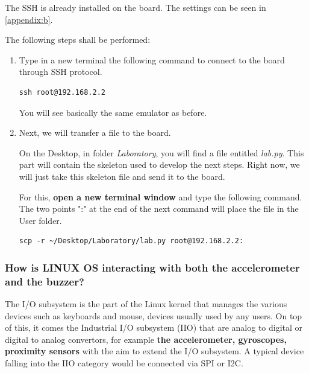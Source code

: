 The SSH is already installed on the board. The settings can be seen in \cref{appendix:b}.

The following steps shall be performed: 
\begin{enumerate}
    \item Type in a new terminal the following command to connect to the board through SSH protocol.
    \begin{tcolorbox}
        \begin{verbatim}
ssh root@192.168.2.2
        \end{verbatim}
    \end{tcolorbox}
    You will see basically the same emulator as before.

    \item Next, we will transfer a file to the board.

    On the Desktop, in folder \textit{Laboratory}, you will find a file entitled \textit{lab.py}. This part will contain the skeleton used to develop the next steps. Right now, we will just take this skeleton file and send it to the board.

    For this, \textbf{open a new terminal window} and type the following command. The two points ":" at the end of the next command will place the file in the User folder.
    \begin{tcolorbox}
     \begin{verbatim}
scp -r ~/Desktop/Laboratory/lab.py root@192.168.2.2:
    \end{verbatim}
    \end{tcolorbox}

\end{enumerate}













\subsubsection{How is LINUX OS interacting with both the accelerometer and the buzzer?}

The I/O subsystem is the part of the Linux kernel that manages the various devices such as keyboards and mouse, devices usually used by any users. On top of this, it comes the Industrial I/O subsystem (IIO) that are analog to digital or digital to analog convertors, for example \textbf{the accelerometer, gyroscopes, proximity sensors} with the aim to extend the I/O subsystem. A typical device falling into the IIO category would be connected via SPI or I2C.






